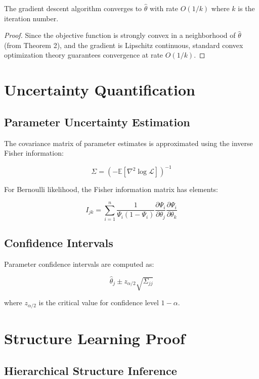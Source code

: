 \documentclass[11pt]{article}
\begin{document}
\begin{theorem}
The gradient descent algorithm converges to $\hat{\theta}$ with rate $O(1/k)$ where $k$ is the iteration number.
\end{theorem}

\begin{proof}
Since the objective function is strongly convex in a neighborhood of $\hat{\theta}$ (from Theorem 2), and the gradient is Lipschitz continuous, standard convex optimization theory guarantees convergence at rate $O(1/k)$.
\end{proof}

\section{Uncertainty Quantification}

\subsection{Parameter Uncertainty Estimation}

The covariance matrix of parameter estimates is approximated using the inverse Fisher information:

\[
\Sigma = \left( -\mathbb{E}[\nabla^2 \log \mathcal{L}] \right)^{-1}
\]

For Bernoulli likelihood, the Fisher information matrix has elements:

\[
I_{jk} = \sum_{i=1}^n \frac{1}{\Psi_i (1-\Psi_i)} \frac{\partial \Psi_i}{\partial \theta_j} \frac{\partial \Psi_i}{\partial \theta_k}
\]

\subsection{Confidence Intervals}

Parameter confidence intervals are computed as:

\[
\hat{\theta}_j \pm z_{\alpha/2} \sqrt{\Sigma_{jj}}
\]

where $z_{\alpha/2}$ is the critical value for confidence level $1-\alpha$.

\section{Structure Learning Proof}

\subsection{Hierarchical Structure Inference}
\end{document}
